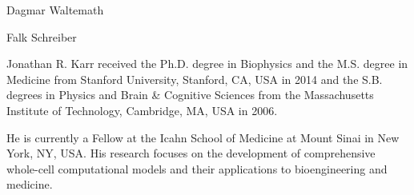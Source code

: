 \documentclass[journal,transmag]{IEEEtran}
\begin{document}
\ifCLASSOPTIONcaptionsoff
  \newpage
\fi





% 

\begin{IEEEbiography}{Dagmar Waltemath}
\end{IEEEbiography}

\begin{IEEEbiography}{Falk Schreiber}
\end{IEEEbiography}

\begin{IEEEbiography}{Jonathan R. Karr}
received the Ph.D. degree in Biophysics and the M.S. degree in Medicine from Stanford University, Stanford, CA, USA in 2014 and the S.B. degrees in Physics and Brain \& Cognitive Sciences from the Massachusetts Institute of Technology, Cambridge, MA, USA in 2006.

He is currently a Fellow at the Icahn School of Medicine at Mount Sinai in New York, NY, USA. His research focuses on the development of comprehensive whole-cell computational models and their applications to bioengineering and medicine.
\end{IEEEbiography}
\end{document}
